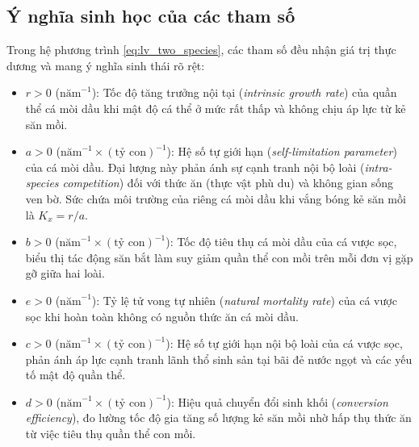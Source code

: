 \subsection{Ý nghĩa sinh học của các tham số}
Trong hệ phương trình \eqref{eq:lv_two_species}, các tham số đều nhận giá trị thực dương và mang ý nghĩa sinh thái rõ rệt:
\begin{itemize}
    \item $r > 0$ ($\text{năm}^{-1}$): Tốc độ tăng trưởng nội tại (\textit{intrinsic growth rate}) của quần thể cá mòi dầu khi mật độ cá thể ở mức rất thấp và không chịu áp lực từ kẻ săn mồi.
    \item $a > 0$ ($\text{năm}^{-1} \times (\text{tỷ con})^{-1}$): Hệ số tự giới hạn (\textit{self-limitation parameter}) của cá mòi dầu. Đại lượng này phản ánh sự cạnh tranh nội bộ loài (\textit{intra-species competition}) đối với thức ăn (thực vật phù du) và không gian sống ven bờ. Sức chứa môi trường của riêng cá mòi dầu khi vắng bóng kẻ săn mồi là $K_x = r/a$.
    \item $b > 0$ ($\text{năm}^{-1} \times (\text{tỷ con})^{-1}$): Tốc độ tiêu thụ cá mòi dầu của cá vược sọc, biểu thị tác động săn bắt làm suy giảm quần thể con mồi trên mỗi đơn vị gặp gỡ giữa hai loài.
    \item $e > 0$ ($\text{năm}^{-1}$): Tỷ lệ tử vong tự nhiên (\textit{natural mortality rate}) của cá vược sọc khi hoàn toàn không có nguồn thức ăn cá mòi dầu.
    \item $c > 0$ ($\text{năm}^{-1} \times (\text{tỷ con})^{-1}$): Hệ số tự giới hạn nội bộ loài của cá vược sọc, phản ánh áp lực cạnh tranh lãnh thổ sinh sản tại bãi đẻ nước ngọt và các yếu tố mật độ quần thể.
    \item $d > 0$ ($\text{năm}^{-1} \times (\text{tỷ con})^{-1}$): Hiệu quả chuyển đổi sinh khối (\textit{conversion efficiency}), đo lường tốc độ gia tăng số lượng kẻ săn mồi nhờ hấp thụ thức ăn từ việc tiêu thụ quần thể con mồi.
\end{itemize}

